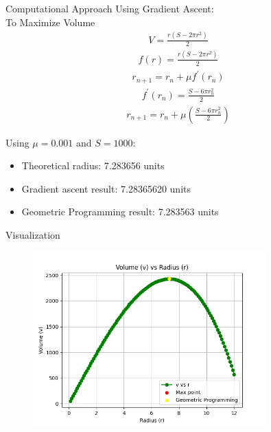 \documentclass{beamer}
\begin{document}
\begin{frame}{Computational Approach}
    Using Gradient Ascent:\\
    To Maximize Volume\\
	\begin{align}
		V = \frac{r\left(S - 2\pi r^2\right)}{2} 
	\end{align}
	\begin{align}   
		f(r) = \frac{r\left(S - 2\pi r^2\right)}{2}
        \end{align}
	\begin{align}   
		r_{n+1} = r_n + \mu f^{\prime}(r_n)
        \end{align}
	\begin{align}   
		f^{\prime}(r_n) = \frac{S - 6\pi r_n^2}{2}
        \end{align}
		\begin{align}
			r_{n+1} = r_n + \mu \left(\frac{S - 6\pi r_n^2}{2}\right)
    \end{align}
\end{frame}
\begin{frame}
    Using $\mu = 0.001$ and $S = 1000$:
    \begin{itemize}
        \item Theoretical radius: 7.283656 units
        \item Gradient ascent result: 7.28365620 units
        \item Geometric Programming result: 7.283563 units
    \end{itemize}
\end{frame}

\begin{frame}{Visualization}
    \begin{figure}[h]
        \centering
        \includegraphics[width=0.8\textwidth]{figs/fig.png}
    \end{figure}
\end{frame}
\end{document}

